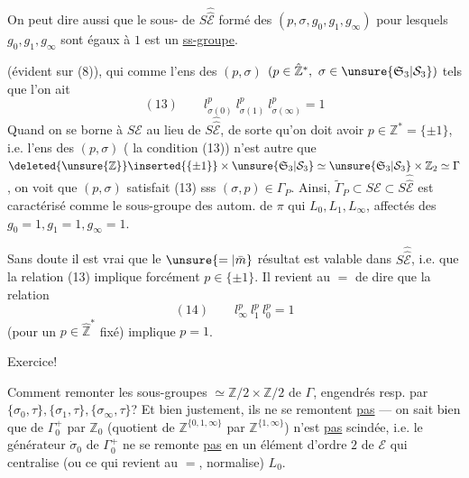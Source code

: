 On peut dire aussi que le sous- de $S\widehat{\widehat{\mathcal E}}$ formé des $(p,\sigma,g_0,g_1,g_\infty)$ pour lesquels $g_0,g_1,g_\infty$ sont égaux à $1$ est un \uline{ss-groupe}.

(évident sur (8)), qui  comme l'ens des $(p,\sigma)$ $(p\in\hat{\mathbb Z}^*,\ \sigma\in\unsure{\mathfrak S_3|\mathcal S_3})$ tels que l'on ait
\[
(13)\qquad l_{\sigma(0)}^p\ l_{\sigma(1)}^p\ l_{\sigma(\infty)}^p=1
\]
Quand on se borne à $S\mathcal E$ au lieu de $S\widehat{\widehat{\mathcal E}}$, de sorte qu'on doit avoir $p\in\mathbb Z^*=\{\pm1\}$,  i.e. l'ens des $(p,\sigma)$ ( la condition (13)) n'est autre que $\deleted{\unsure{\mathbb Z}}\inserted{\{\pm1\}}\times\unsure{\mathfrak S_3|\mathcal S_3}\simeq\unsure{\mathfrak S_3|\mathcal S_3}\times\mathbb Z_2\simeq\Gamma$, on voit que $(p,\sigma)$ satisfait (13) sss $(\sigma,p)\in\Gamma_P$. Ainsi, $\tilde\Gamma_P\subset S\mathcal E\subset S\widehat{\widehat{\mathcal E}}$ est caractérisé comme le sous-groupe  des autom. de $\pi$  qui  $L_0,L_1,L_\infty$, affectés des  $g_0=1,g_1=1,g_\infty=1$.

Sans doute il est vrai que le $\unsure{=|\bar m}$ résultat est valable dans $S\widehat{\widehat{\mathcal E}}$, i.e. que la relation (13) implique forcément $p\in\{\pm1\}$. Il revient au $=$ de dire  que la relation
\[
(14)\qquad l_\infty^p\ l_1^p\ l_0^p=1
\]
(pour un $p\in\hat{\mathbb Z}^*$ fixé) implique $p=1$.

Exercice!

Comment remonter les sous-groupes  $\simeq\mathbb Z/2\times\mathbb Z/2$ de $\Gamma$, engendrés resp. par $\{\sigma_0,\tau\},\{\sigma_1,\tau\},\{\sigma_\infty,\tau\}$? Et bien justement, ils ne se remontent \uline{pas} --- on sait bien que  de $\Gamma_0^+$  par $\mathbb Z_0$ (quotient de $\mathbb Z^{\{0,1,\infty\}}$ par $\mathbb Z^{\{1,\infty\}}$) n'est \uline{pas} scindée, i.e. le générateur $\dot\sigma_0$ de $\Gamma_0^+$ ne se remonte \uline{pas} en un élément d'ordre $2$ de $\mathcal E$ qui centralise (ou ce qui revient au $=$, normalise) $L_0$.

